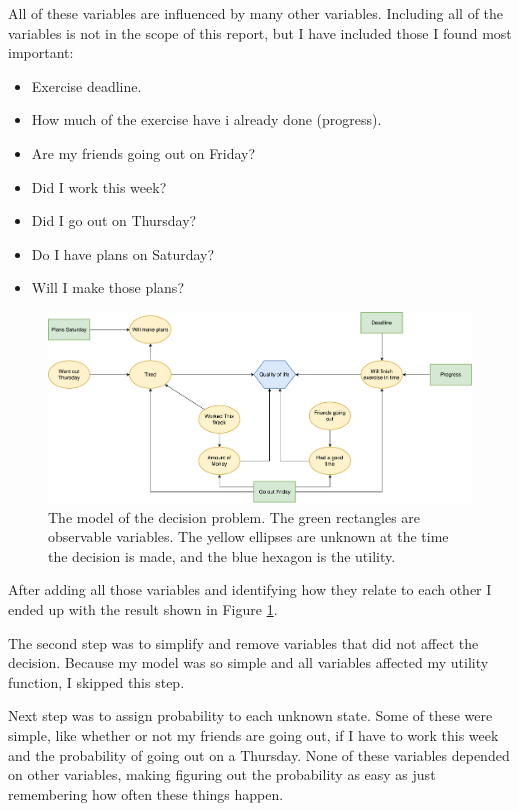 \documentclass{article}
\begin{document}
    All of these variables are influenced by many other variables. Including
    all of the variables is not in the scope of this report, but I have
    included those I found most important:

    \begin{itemize}
        \item Exercise deadline.
        \item How much of the exercise have i already done (progress).
        \item Are my friends going out on Friday?
        \item Did I work this week?
        \item Did I go out on Thursday?
        \item Do I have plans on Saturday?
        \item Will I make those plans?
    \end{itemize}

    \begin{figure}[ht] \centering
        \centering
        \includegraphics[width=\linewidth]{drawing.pdf}
        \caption{The model of the decision problem. The green rectangles are
        observable variables.  The yellow ellipses are unknown at the time
        the decision is made, and the blue hexagon is the utility.}
    \label{fig:model} \end{figure}

    After adding all those variables and identifying how they relate to each
    other I ended up with the result shown in Figure \ref{fig:model}.

    The second step was to simplify and remove variables that did not affect the
    decision. Because my model was so simple and all variables affected my
    utility function, I skipped this step.

    Next step was to assign probability to each unknown state. Some of these
    were simple, like whether or not my friends are going out, if I have to
    work this week and the probability of going out on a Thursday. None of
    these variables depended on other variables, making figuring out the
    probability as easy as just remembering how often these things happen.
\end{document}
